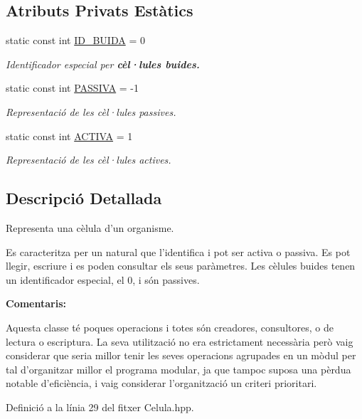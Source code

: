 \subsection*{Atributs Privats Estàtics}
\begin{DoxyCompactItemize}
\item 
static const int \hyperlink{class_celula_a22f5121a6d3cc3cee44274b55ec842e9}{I\-D\-\_\-\-B\-U\-I\-D\-A} = 0
\begin{DoxyCompactList}\small\item\em Identificador especial per {\bfseries cèl·lules buides.} \end{DoxyCompactList}\item 
static const int \hyperlink{class_celula_aea4803f947d114aaea4861232f6f3a38}{P\-A\-S\-S\-I\-V\-A} = -\/1
\begin{DoxyCompactList}\small\item\em Representació de les cèl·lules passives. \end{DoxyCompactList}\item 
static const int \hyperlink{class_celula_a3c06376789ddb1605295cbf3835d01bb}{A\-C\-T\-I\-V\-A} = 1
\begin{DoxyCompactList}\small\item\em Representació de les cèl·lules actives. \end{DoxyCompactList}\end{DoxyCompactItemize}


\subsection{Descripció Detallada}
Representa una cèlula d'un organisme. 

Es caracteritza per un natural que l'identifica i pot ser activa o passiva. Es pot llegir, escriure i es poden consultar els seus paràmetres. Les cèlules buides tenen un identificador especial, el 0, i són passives.

{\bfseries Comentaris\-:}

Aquesta classe té poques operacions i totes són creadores, consultores, o de lectura o escriptura. La seva utilització no era estrictament necessària però vaig considerar que seria millor tenir les seves operacions agrupades en un mòdul per tal d'organitzar millor el programa modular, ja que tampoc suposa una pèrdua notable d'eficiència, i vaig considerar l'organització un criteri prioritari. 

Definició a la línia 29 del fitxer Celula.\-hpp.



